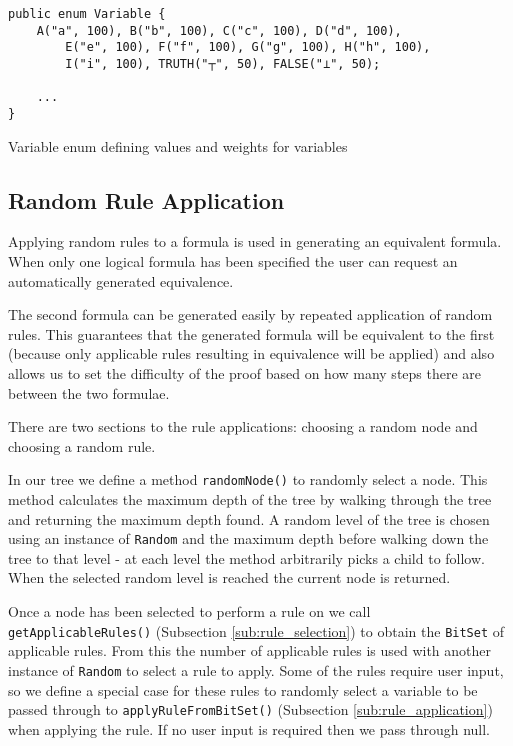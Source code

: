 \documentclass[draft]{report}
\begin{document}
\begin{listing}[ht]
\begin{verbatim}
public enum Variable {
    A("a", 100), B("b", 100), C("c", 100), D("d", 100), 
        E("e", 100), F("f", 100), G("g", 100), H("h", 100), 
        I("i", 100), TRUTH("┬", 50), FALSE("⊥", 50);

    ...
}
\end{verbatim}
\caption{Variable enum defining values and weights for variables}
\label{variableenum}
\end{listing}

\subsection{Random Rule Application}

Applying random rules to a formula is used in generating an equivalent formula. When only one logical formula has been specified the user can request an automatically generated equivalence.

The second formula can be generated easily by repeated application of random rules. This guarantees that the generated formula will be equivalent to the first (because only applicable rules resulting in equivalence will be applied) and also allows us to set the difficulty of the proof based on how many steps there are between the two formulae.

There are two sections to the rule applications: choosing a random node and choosing a random rule. 

In our tree we define a method {\tt randomNode()} to randomly select a node. This method calculates the maximum depth of the tree by walking through the tree and returning the maximum depth found. A random level of the tree is chosen using an instance of {\tt Random} and the maximum depth before walking down the tree to that level - at each level the method arbitrarily picks a child to follow. When the selected random level is reached the current node is returned.

Once a node has been selected to perform a rule on we call {\tt getApplicableRules()} (Subsection \ref{sub:rule_selection}) to obtain the {\tt BitSet} of applicable rules. From this the number of applicable rules is used with another instance of {\tt Random} to select a rule to apply. Some of the rules require user input, so we define a special case for these rules to randomly select a variable to be passed through to {\tt applyRuleFromBitSet()} (Subsection \ref{sub:rule_application}) when applying the rule. If no user input is required then we pass through null.
\end{document}
